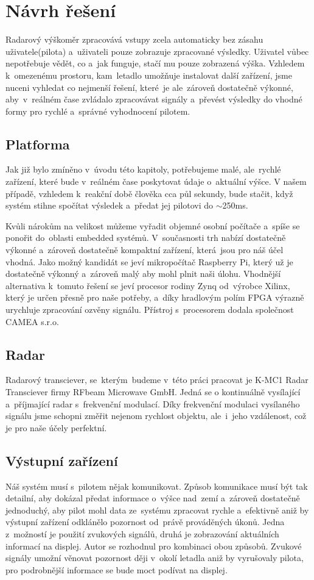 				
			
\chapter{Návrh řešení}\label{navrhReseni}
	Radarový výškoměr zpracovává vstupy zcela automaticky bez zásahu uživatele(pilota) a~uživateli pouze zobrazuje zpracované výsledky. Uživatel vůbec nepotřebuje vědět, co a~jak funguje, stačí mu pouze zobrazená výška. Vzhledem k~omezenému prostoru, kam~letadlo umožňuje instalovat další zařízení, jsme nuceni vyhledat co nejmenší řešení, které~je ale~zároveň dostatečně výkonné, aby~v~reálném čase zvládalo zpracovávat signály a~převést výsledky do vhodné formy pro rychlé a~správné vyhodnocení pilotem.
	
	\section{Platforma}\label{navrhReseni::platforma}
		Jak již bylo zmíněno v~úvodu této kapitoly, potřebujeme malé, ale~rychlé zařízení, které bude v~reálném čase poskytovat údaje o~aktuální výšce. V našem případě, vzhledem k~reakční době člověka cca půl sekundy, bude stačit, když systém stihne spočítat výsledek a~předat jej pilotovi do $\sim$250ms.\par
		
		Kvůli nárokům na velikost můžeme vyřadit objemné osobní počítače a~spíše se ponořit do~oblasti embedded systémů. V~současnosti trh nabízí dostatečně výkonné a~zároveň dostatečně kompaktní zařízení, která~jsou pro náš účel vhodná. Jako možný kandidát se jeví mikropočítač Raspberry Pi, který už je dostatečně výkonný a~zároveň malý aby mohl plnit naši úlohu. Vhodnější alternativa k~tomuto řešení se jeví procesor rodiny Zynq od~výrobce Xilinx, který je určen přesně pro naše potřeby, a~díky hradlovým polím FPGA výrazně urychluje zpracování ozvěny signálu. Přístroj s~procesorem dodala společnost CAMEA s.r.o.
	\section{Radar}
		Radarový transciever, se~kterým~budeme v~této práci pracovat je K-MC1 Radar Transciever firmy RFbeam Microwave GmbH. Jedná se o kontinuálně vysílající a~příjmající radar s~frekvenční modulací. Díky frekvenční modulaci vysílaného signálu jsme schopni změřit nejenom rychlost objektu, ale~i~jeho vzdálenost, což je pro naše účely perfektní.
	
		
	\section{Výstupní zařízení}
		Náš systém musí s~pilotem nějak komunikovat. Způsob komunikace musí být tak detailní, aby dokázal předat informace o~výšce nad~zemí a~zároveň dostatečně jednoduchý, aby pilot mohl data ze~systému zpracovat rychle a~efektivně aniž by výstupní zařízení odklánělo pozornost od~právě prováděných úkonů. Jedna z~možností je použití zvukových signálů, druhá je zobrazování aktuálních informací na displej. Autor se rozhodnul pro kombinaci obou způsobů. Zvukové signály umožní věnovat pozornost ději v~okolí letadla aniž by vyrušovaly pilota, pro podrobnější informace se bude moct podívat na displej.
			
